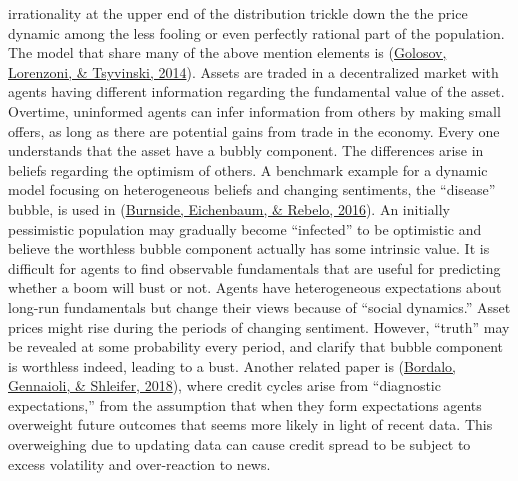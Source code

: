 \documentclass[
  12pt,
]{article}
\begin{document}
irrationality at the upper end of the distribution trickle down the the price dynamic among the less fooling or even perfectly rational part of the population.
The model that share many of the above mention elements is (\protect\hyperlink{ref-golosov_decentralized_2014}{Golosov, Lorenzoni, \& Tsyvinski, 2014}). Assets are traded in a decentralized market with agents having different information regarding the fundamental value of the asset. Overtime, uninformed agents can infer information from others by making small offers, as long as there are potential gains from trade in the economy. Every one understands that the asset have a bubbly component. The differences arise in beliefs regarding the optimism of others.
A benchmark example for a dynamic model focusing on heterogeneous beliefs and changing sentiments, the ``disease'' bubble, is used in (\protect\hyperlink{ref-burnside_understanding_2016}{Burnside, Eichenbaum, \& Rebelo, 2016}). An initially pessimistic population may gradually become ``infected'' to be optimistic and believe the worthless bubble component actually has some intrinsic value. It is difficult for agents to find observable fundamentals that are useful for predicting whether a boom will bust or not. Agents have heterogeneous expectations about long-run fundamentals but change their views because of ``social dynamics.'' Asset prices might rise during the periods of changing sentiment. However, ``truth'' may be revealed at some probability every period, and clarify that bubble component is worthless indeed, leading to a bust. Another related paper is (\protect\hyperlink{ref-bordalo_diagnostic_2018}{Bordalo, Gennaioli, \& Shleifer, 2018}), where credit cycles arise from ``diagnostic expectations,'' from the assumption that when they form expectations agents overweight future outcomes that seems more likely in light of recent data. This overweighing due to updating data can cause credit spread to be subject to excess volatility and over-reaction to news.
\end{document}
